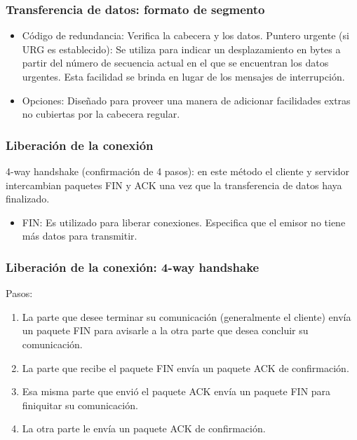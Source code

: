 \documentclass{beamer}
\begin{document}
\begin{frame}
\frametitle{Transferencia de datos: formato de segmento}
\begin{itemize}
\item Código de redundancia: Verifica la cabecera y los datos.
Puntero urgente (si URG es establecido): Se utiliza para indicar un desplazamiento en bytes a partir del número de secuencia actual en el que se encuentran los datos urgentes. Esta facilidad se brinda en lugar de los mensajes de interrupción.
\item Opciones: Diseñado para proveer una manera de adicionar facilidades extras no cubiertas por la cabecera regular.
\end{itemize}
\end{frame}

\begin{frame}
\frametitle{Liberación de la conexión}
4-way handshake (confirmación de 4 pasos): en este método el cliente y servidor intercambian paquetes FIN y ACK una vez que la transferencia de datos haya finalizado.
\vspace{5mm}
\begin{itemize}
\item FIN: Es utilizado para liberar conexiones. Especifica que el emisor no tiene más datos para transmitir. 
\end{itemize}
\end{frame}

\begin{frame}
\frametitle{Liberación de la conexión: 4-way handshake}
Pasos:
\vspace{5mm}
\begin{enumerate}
\item La parte que desee terminar su comunicación (generalmente el cliente) envía un paquete FIN para avisarle a la otra parte que desea concluir su comunicación.
\item La parte que recibe el paquete FIN envía un paquete ACK de confirmación.
\item Esa misma parte que envió el paquete ACK envía un paquete FIN para finiquitar su comunicación.
\item La otra parte le envía un paquete ACK de confirmación.
\end{enumerate}
\end{frame}
\end{document}
